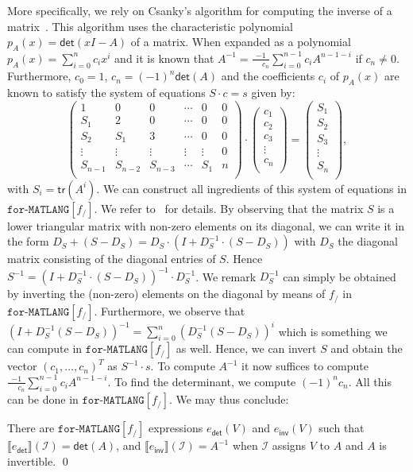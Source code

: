 \documentclass[sigconf]{acmart}
\newcommand{\sem}[2]{\llbracket #1 \rrbracket(#2)}
\newcommand{\I}{\mathcal{I}}
\newcommand{\langforf}[1]{\texttt{for}\text{-}\texttt{MATLANG}[#1]\xspace}
\begin{document}
More specifically, we rely on Csanky's algorithm for computing the inverse of a matrix~\cite{Csanky76}. This algorithm uses the characteristic
polynomial $p_A(x)=\mathsf{det}(xI-A)$ of a matrix. When expanded as a polynomial
$p_A(x)=\sum_{i=0}^{n} c_i x^i$ and it is known that $A^{-1}=\frac{-1}{\phantom{-1}c_n}\sum_{i=0}^{n-1}c_i A^{n-1-i}$
if $c_n\neq 0$. Furthermore, $c_0=1$, $c_n=(-1)^n\mathsf{det}(A)$ and the coefficients $c_i$ of $p_A(x)$
are known to satisfy the system of equations $S\cdot c=s$ given by:
$$
\left(\begin{matrix}
1 & 0 & 0 & \cdots & 0 & 0\\
S_1 & 2 & 0 & \cdots  &0 & 0\\
S_2 & S_1 & 3 & \cdots  &0 & 0\\
\vdots & \vdots & \vdots & \vdots & \vdots & 0\\
S_{n-1} & S_{n-2} & S_{n-3} & \cdots & S_1 & n\\
\end{matrix}\right)\cdot
\left(\begin{matrix}
c_1\\
c_2\\
c_3\\
\vdots\\
c_n\\
\end{matrix}\right)=\left(\begin{matrix}
S_1\\
S_2\\
S_3\\
\vdots\\
S_n\\
\end{matrix}\right),
$$
with $S_i=\mathsf{tr}(A^i)$. We can construct all ingredients of this system of equations in $\langforf{f_/}$. We refer to~\cite{geerts2020expressive} for details. By observing that the matrix $S$ is a lower triangular matrix with non-zero elements on its diagonal, we can write it in the form $D_S+(S-D_{S})=D_S\cdot(I+D_S^{-1}\cdot (S-D_S))$ with $D_S$ the diagonal matrix consisting of the diagonal entries of $S$.
Hence $S^{-1}=(I+D_{S}^{-1}\cdot(S-D_{S}))^{-1}\cdot D_S^{-1}$. 
We remark $D_S^{-1}$ can simply be obtained by inverting the (non-zero) elements on the diagonal by means of $f_/$ in $\langforf{f_/}$. Furthermore, we observe that $(I+D_S^{-1}(S-D_S))^{-1}=\sum_{i=0}^{n}(D_S^{-1}(S-D_S))^i$ which is something
we can compute in $\langforf{f_/}$ as well. Hence, we can invert $S$ and obtain the vector $(c_1,\ldots,c_n)^T$ as $S^{-1}\cdot s$. To compute $A^{-1}$ it now suffices to compute
$\frac{-1}{\phantom{-1}c_n}\sum_{i=0}^{n-1}c_i A^{n-1-i}$. To find the determinant,
we compute $(-1)^nc_n$. All this can be done in $\langforf{f_/}$.
We may thus conclude:
\begin{proposition}\label{prop:inverse}
There are $\langforf{f_/}$ expressions $e_{\mathsf{det}}(V)$ and $e_{\mathsf{inv}}(V)$ such that
$\sem{e_{\mathsf{det}}}{\I}=\mathsf{det}(A)$, and  
$\sem{e_{\mathsf{inv}}}{\I}=A^{-1}$ when $\I$ assigns $V$
to $A$ and $A$ is invertible.
\qed
\end{proposition}
\end{document}
